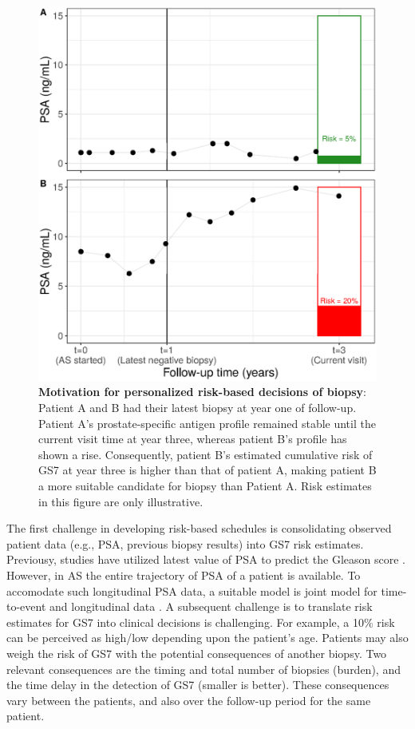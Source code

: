 \begin{figure}[!htb]
\centerline{\includegraphics[width=\columnwidth]{images/riskBasedExample.eps}}
\caption{\textbf{Motivation for personalized risk-based decisions of biopsy}: Patient A and B had their latest biopsy at year one of follow-up. Patient A's prostate-specific antigen profile remained stable until the current visit time at year three, whereas patient B's profile has shown a rise. Consequently, patient B's estimated cumulative risk of GS7 at year three is higher than that of patient A, making patient B a more suitable candidate for biopsy than Patient A. Risk estimates in this figure are only illustrative.}
\label{fig:riskBasedExample}
\end{figure}

The first challenge in developing risk-based schedules is consolidating observed patient data (e.g., PSA, previous biopsy results) into GS7 risk estimates. Previousy, studies have utilized latest value of PSA to predict the Gleason score \citep{partin1993use,makarov2007updated}. However, in AS the entire trajectory of PSA of a patient is available. To accomodate such longitudinal PSA data, a suitable model is joint model for time-to-event and longitudinal data \citep{tomer2019,coley2017prediction,rizopoulos2012joint}. A subsequent challenge is to translate risk estimates for GS7 into clinical decisions is challenging. For example, a 10\% risk can be perceived as high/low depending upon the patient's age. Patients may also weigh the risk of GS7 with the potential consequences of another biopsy. Two relevant consequences are the timing and total number of biopsies (burden), and the time delay in the detection of GS7 (smaller is better). These consequences vary between the patients, and also over the follow-up period for the same patient.

